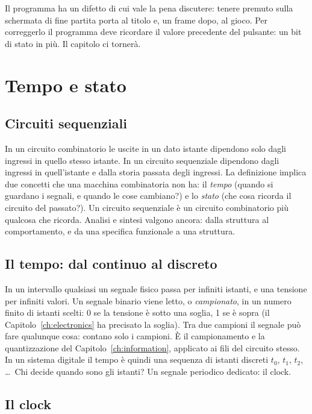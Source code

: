 Il programma ha un difetto di cui vale la pena discutere: tenere premuto
 sulla schermata di fine partita porta al titolo e, un frame dopo, al
gioco. Per correggerlo il programma deve ricordare il valore precedente del
pulsante: un bit di stato in più. Il capitolo ci tornerà.

\section{Tempo e stato}

\subsection{Circuiti sequenziali}

In un circuito combinatorio le uscite in un dato istante dipendono solo dagli
ingressi in quello stesso istante. In un circuito sequenziale dipendono dagli
ingressi in quell'istante e dalla storia passata degli ingressi. La definizione
implica due concetti che una macchina combinatoria non ha: il \emph{tempo}
(quando si guardano i segnali, e quando le cose cambiano?) e lo \emph{stato}
(che cosa ricorda il circuito del passato?). Un circuito sequenziale è un
circuito combinatorio più qualcosa che ricorda. Analisi e sintesi valgono
ancora: dalla struttura al comportamento, e da una specifica funzionale a una
struttura.

\subsection{Il tempo: dal continuo al discreto}

In un intervallo qualsiasi un segnale fisico passa per infiniti istanti, e una
tensione per infiniti valori. Un segnale binario viene letto, o
\emph{campionato}, in un numero finito di istanti scelti: 0 se la tensione è
sotto una soglia, 1 se è sopra (il Capitolo~\ref{ch:electronics} ha precisato
la soglia). Tra due campioni il segnale può fare qualunque cosa: contano solo i
campioni. È il campionamento e la quantizzazione del
Capitolo~\ref{ch:information}, applicato ai fili del circuito stesso. In un
sistema digitale il tempo è quindi una sequenza di istanti discreti $t_0$,
$t_1$, $t_2$, \ldots\ Chi decide quando sono gli istanti? Un segnale periodico
dedicato: il clock.

\subsection{Il clock}

